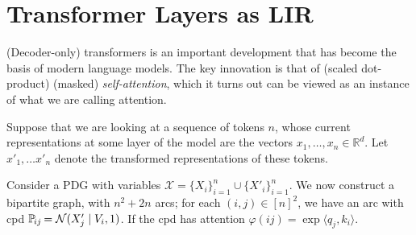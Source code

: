 \documentclass{article} %
\theoremstyle{plain}
\theoremstyle{definition}
\theoremstyle{remark}
\let\cite\citep
\begin{document}
\section{Transformer Layers as LIR}

(Decoder-only) transformers \cite{TODO:Vaswani17} is an important development that has become the basis of modern language models.
The key innovation is that of (scaled dot-product) (masked) \emph{self-attention}, which it turns out can be viewed as an instance of what we are calling attention.

Suppose that we are looking at a sequence of tokens $n$, whose current representations at some layer of the model are the vectors $x_1, \ldots, x_n \in \mathbb R^d$. 
Let $x'_1, \ldots x'_n$ denote the transformed representations of these tokens. 

Consider a PDG with variables $\mathcal X = \{ X_i \}_{i=1}^n \cup \{ X'_i\}_{i=1}^n$. 
We now construct a bipartite graph, with $n^2 + 2n$ arcs; for each $(i,j) \in [n]^2$, 
we have an arc 
with cpd $\p_{ij} = \mathcal N(X'_j \mid V_i, 1)$.
If the cpd has attention $\varphi(ij) = \exp \langle q_j, k_i\rangle$.

\begin{center}
   \def\vdotsmall{\rotatebox{90}{$\cdot{\cdot}\cdot$}}
\end{center}
\end{document}
